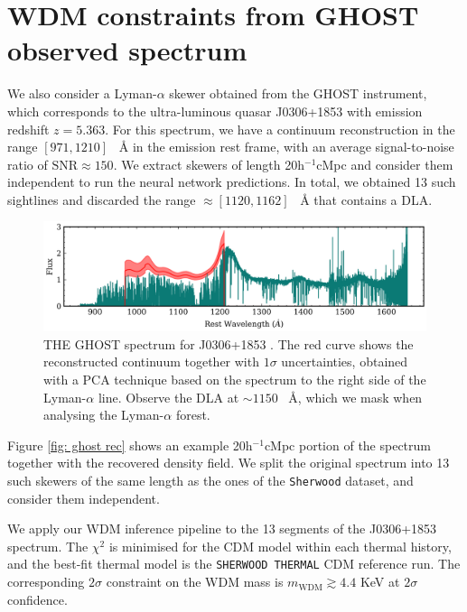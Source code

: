 \section{WDM constraints from GHOST observed spectrum}\label{sec:inference ghost}
We also consider a Lyman-$\alpha$ skewer obtained from the GHOST instrument, which corresponds to the ultra-luminous quasar J0306+1853 \cite{Wang_2015} with emission redshift $z=5.363$. For this spectrum, we have a continuum reconstruction in the range $[971, 1210]$ \textup{~\AA} in the emission rest frame, with an average signal-to-noise ratio of $\mathrm{SNR}\approx 150$. We extract skewers of length 20h$^{-1}$cMpc and consider them independent to run the neural network predictions. In total, we obtained 13 such sightlines and discarded the range $\approx [1120,1162]$ \textup{~\AA} that contains a DLA.


\begin{figure}
    \centering
    \includegraphics[width=0.7\linewidth]{img/ML/ghost_spectrum.png}
    \caption{THE GHOST spectrum for J0306+1853 \cite{Wang_2015}. The red curve shows the reconstructed continuum together with $1\sigma$ uncertainties, obtained with a PCA technique based on the spectrum to the right side of the Lyman-$\alpha$ line. Observe the DLA at $\sim 1150$ \textup{~\AA}, which we mask when analysing the Lyman-$\alpha$ forest. }
    \label{fig: ghost spectrum}
\end{figure}



Figure \ref{fig: ghost rec} shows an example 20h$^{-1}$cMpc portion of the spectrum together with the recovered density field. We split the original spectrum into 13 such skewers of the same length as the ones of the \texttt{Sherwood} dataset, and consider them independent.

We apply our WDM inference pipeline to the 13 segments of the J0306+1853 spectrum. The $\chi^2$ is minimised for the CDM model within each thermal history, and the best-fit thermal model is the \texttt{SHERWOOD THERMAL} CDM reference run. The corresponding $2\sigma$ constraint on the WDM mass is $m_{\mathrm{WDM}} \gtrsim 4.4$ KeV at $2\sigma$ confidence.




